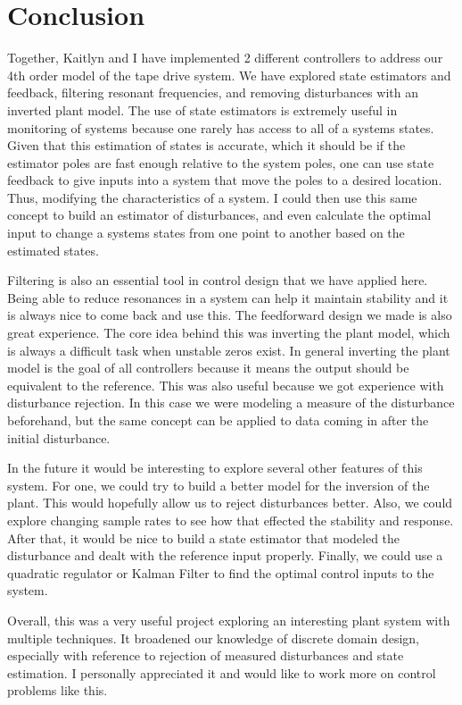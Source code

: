\documentclass[11pt]{article}
\begin{document}
\section{Conclusion}
Together, Kaitlyn and I have implemented 2 different controllers to address our 4th order model of the tape drive system. We have explored state estimators and feedback, filtering resonant frequencies, and removing disturbances with an inverted plant model. The use of state estimators is extremely useful in monitoring of systems because one rarely has access to all of a systems states. Given that this estimation of states is accurate, which it should be if the estimator poles are fast enough
relative to the system poles, one can use state feedback to give inputs into a system that move the poles to a desired location.
Thus, modifying the characteristics of a system. I could then use this same concept to build an estimator of disturbances, and even calculate the optimal input to change a systems states from one point to another based on the estimated states.

Filtering is also an essential tool in control design that we have applied here. Being able to reduce resonances in a system can help it maintain stability and it is always nice to come back and use this. The feedforward design we made is also great experience. The core idea behind this was inverting the plant model, which is always a difficult task when unstable zeros exist. In general inverting the plant model is the goal of all controllers because it means the output should be equivalent
to the reference. This was also useful because we got experience with disturbance rejection. In this case we were modeling a measure of the disturbance beforehand, but the same concept can be applied to data coming in after the initial disturbance.

In the future it would be interesting to explore several other features of this system. For one, we could try to build a better model for the inversion of the plant. This would hopefully allow us to reject disturbances better. Also, we could explore changing sample rates to see how that effected the stability and response. After that, it would be nice to build a state estimator that modeled the disturbance and dealt with the reference input properly. Finally, we could use a quadratic
regulator or Kalman Filter to find the optimal control inputs to the system.

Overall, this was a very useful project exploring an interesting plant system with multiple techniques. It broadened our knowledge of discrete domain design, especially with reference to rejection of measured disturbances and state estimation. I personally appreciated it and would like to work more on control problems like this.
\end{document}
